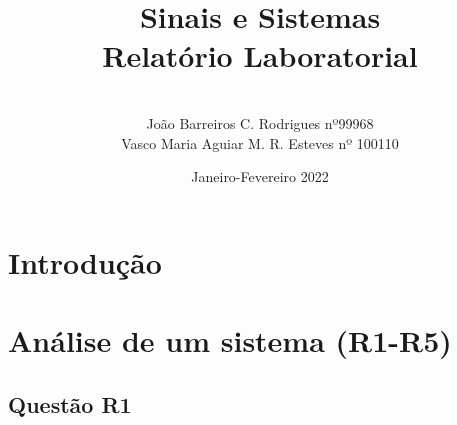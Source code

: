 \documentclass[a4paper,12pt]{article}
\date{Janeiro-Fevereiro 2022}
\title{Sinais e Sistemas \\ \large {Relatório Laboratorial}}
\author{
\\ João Barreiros C. Rodrigues nº99968
\\Vasco Maria  Aguiar M. R. Esteves nº 100110 }
\begin{document}
	\begin{titlepage}
		\maketitle
	\end{titlepage}
	\section{Introdução}
	\newpage
	\section{Análise de um sistema (R1-R5)}
		\subsection{Questão R1}
\end{document}
